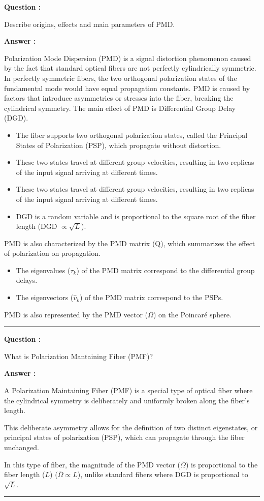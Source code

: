 \documentclass[a4paper,11pt]{book}
\newcounter{qacount}
\newenvironment{question}{
  \refstepcounter{qacount}
  \vspace{1em} %
  \noindent\textbf{Question \theqacount:}\space
}{
  \par %
}
\newenvironment{answer}{
  \noindent\textbf{Answer \theqacount:}\space
}{
  \par\vspace{1em}   %
  \hrule             %
  \vspace{0.5em}     %
}
\begin{document}
\begin{question}
    Describe origins, effects and main parameters of PMD.
\end{question}

\begin{answer}
    Polarization Mode Dispersion (PMD) is a signal distortion phenomenon caused by the fact that standard optical fibers are not perfectly cylindrically symmetric. In perfectly symmetric fibers, the two orthogonal polarization states of the fundamental mode would have equal propagation constants.
    PMD is caused by factors that introduce asymmetries or stresses into the fiber, breaking the cylindrical symmetry.
    The main effect of PMD is Differential Group Delay (DGD).
    \begin{itemize}
        \item The fiber supports two orthogonal polarization states, called the Principal States of Polarization (PSP), which propagate without distortion.
        \item These two states travel at different group velocities, resulting in two replicas of the input signal arriving at different times.
        \item These two states travel at different group velocities, resulting in two replicas of the input signal arriving at different times.
        \item DGD is a random variable and is proportional to the square root of the fiber length (DGD $\propto \sqrt{L}$).
    \end{itemize}
    PMD is also characterized by the PMD matrix (Q), which summarizes the effect of polarization on propagation.

    \begin{itemize}
        \item The eigenvalues ($\tau_k$) of the PMD matrix correspond to the differential group delays.
        \item The eigenvectors ($\hat{v}_k$) of the PMD matrix correspond to the PSPs.
    \end{itemize}
    PMD is also represented by the PMD vector ($\overline{\Omega}$) on the Poincaré sphere.
\end{answer}

\begin{question}
    What is Polarization Mantaining Fiber (PMF)?
\end{question}

\begin{answer}
    A Polarization Maintaining Fiber (PMF) is a special type of optical fiber where the cylindrical symmetry is deliberately and uniformly broken along the fiber's length.

    This deliberate asymmetry allows for the definition of two distinct eigenstates, or principal states of polarization (PSP), which can propagate through the fiber unchanged.

    In this type of fiber, the magnitude of the PMD vector ($\overline{\Omega}$) is proportional to the fiber length ($L$) ($\overline{\Omega} \propto L$), unlike standard fibers where DGD is proportional to $\sqrt{L}$.
\end{answer}
\end{document}
